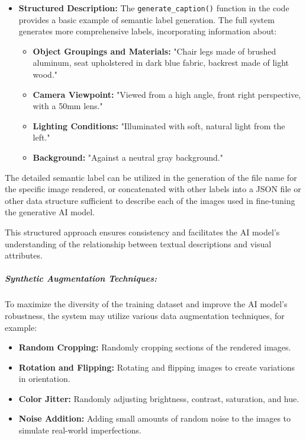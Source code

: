 \documentclass{article}
\begin{document}
\begin{itemize}
    \item \textbf{Structured Description:} The \texttt{generate\_caption()} function in the code provides a basic example of semantic label generation. The full system generates more comprehensive labels, incorporating information about:
    \begin{itemize}
        \item \textbf{Object Groupings and Materials:} "Chair legs made of brushed aluminum, seat upholstered in dark blue fabric, backrest made of light wood."
        \item \textbf{Camera Viewpoint:} "Viewed from a high angle, front right perspective, with a 50mm lens."
        \item \textbf{Lighting Conditions:} "Illuminated with soft, natural light from the left."
        \item \textbf{Background:} "Against a neutral gray background."
    \end{itemize}
\end{itemize}

The detailed semantic label can be utilized in the generation of the file name for the specific image rendered, or concatenated with other labels into a JSON file or other data structure sufficient to describe each of the images used in fine-tuning the generative AI model. 

This structured approach ensures consistency and facilitates the AI model's understanding of the relationship between textual descriptions and visual attributes.

\subparagraph{Synthetic Augmentation Techniques:} To maximize the diversity of the training dataset and improve the AI model's robustness, the system may utilize various data augmentation techniques, for example:

\begin{itemize}
    \item \textbf{Random Cropping:} Randomly cropping sections of the rendered images.
    \item \textbf{Rotation and Flipping:} Rotating and flipping images to create variations in orientation.
    \item \textbf{Color Jitter:} Randomly adjusting brightness, contrast, saturation, and hue.
    \item \textbf{Noise Addition:} Adding small amounts of random noise to the images to simulate real-world imperfections.
\end{itemize}
\end{document}

